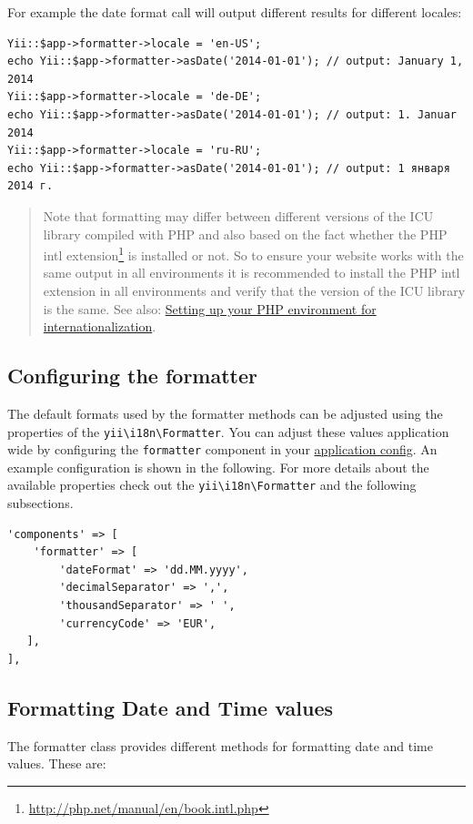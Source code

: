 For example the date format call will output different results for different locales:

\lstset{language=php}\begin{lstlisting}
Yii::$app->formatter->locale = 'en-US';
echo Yii::$app->formatter->asDate('2014-01-01'); // output: January 1, 2014
Yii::$app->formatter->locale = 'de-DE';
echo Yii::$app->formatter->asDate('2014-01-01'); // output: 1. Januar 2014
Yii::$app->formatter->locale = 'ru-RU';
echo Yii::$app->formatter->asDate('2014-01-01'); // output: 1 января 2014 г.
\end{lstlisting}
\begin{quote}Note that formatting may differ between different versions of the ICU library compiled with PHP and also based on the fact whether the
PHP intl extension\footnote{\url{http://php.net/manual/en/book.intl.php}} is installed or not. So to ensure your website works with the same output
in all environments it is recommended to install the PHP intl extension in all environments and verify that the version of the ICU library
is the same. See also: \hyperref[tutorial-i18n.md::setup-environment]{Setting up your PHP environment for internationalization}.

\end{quote}
\subsection{Configuring the formatter \label{output-formatter.md::configuring-format}}
The default formats used by the formatter methods can be adjusted using the properties of the \texttt{yii{\allowbreak{}\textbackslash}i18n{\allowbreak{}\textbackslash}Formatter}.
You can adjust these values application wide by configuring the \lstinline|formatter| component in your \hyperref[concept-configurations.md::application-configurations]{application config}.
An example configuration is shown in the following.
For more details about the available properties check out the \texttt{yii{\allowbreak{}\textbackslash}i18n{\allowbreak{}\textbackslash}Formatter} and the following subsections.

\lstset{language=php}\begin{lstlisting}
'components' => [
    'formatter' => [
        'dateFormat' => 'dd.MM.yyyy',
        'decimalSeparator' => ',',
        'thousandSeparator' => ' ',
        'currencyCode' => 'EUR',
   ],
],
\end{lstlisting}
\subsection{Formatting Date and Time values \label{output-formatter.md::date-and-time}}
The formatter class provides different methods for formatting date and time values. These are:

